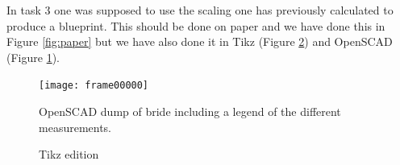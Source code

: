\documentclass{report}
\begin{document}
In task 3 one was supposed to use the scaling one has previously calculated to produce a blueprint. This should be done on paper and we have done this in Figure \ref{fig:paper} but we have also done it in Tikz (Figure \ref{fig:tikz}) and OpenSCAD (Figure \ref{fig:bridge}).

\begin{figure}[H]
	\centering
	\texttt{[image: frame00000]}

	\caption {OpenSCAD dump of bride including a legend of the different measurements.}
	\label{fig:bridge}
\end{figure}

\begin{figure}[H]
	\centering
	\caption{Tikz edition}
	\label{fig:tikz}
\end{figure}
\end{document}
